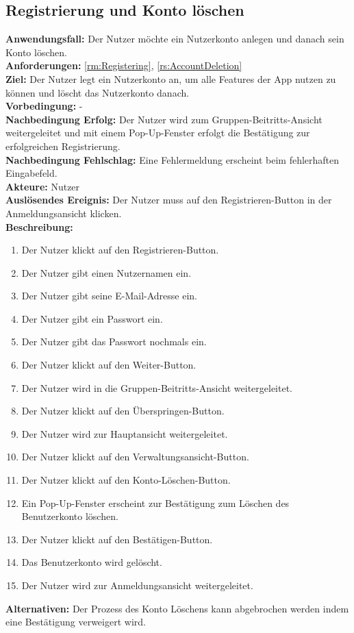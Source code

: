 \documentclass[parskip=full]{scrartcl}
\begin{document}
\subsection{Registrierung und Konto löschen}
\textbf{Anwendungsfall:} Der Nutzer möchte ein Nutzerkonto anlegen und danach sein Konto löschen.\\
\textbf{Anforderungen:} \ref{rm:Registering}, \ref{rs:AccountDeletion} \\
\textbf{Ziel:} Der Nutzer legt ein Nutzerkonto an, um alle Features der App nutzen zu können und löscht das Nutzerkonto danach.\\
\textbf{Vorbedingung:} -\\
\textbf{Nachbedingung Erfolg:} Der Nutzer wird zum Gruppen-Beitritts-Ansicht weitergeleitet und mit einem Pop-Up-Fenster erfolgt die Bestätigung zur erfolgreichen Registrierung.\\
\textbf{Nachbedingung Fehlschlag:} Eine Fehlermeldung erscheint beim fehlerhaften Eingabefeld.\\
\textbf{Akteure:} Nutzer\\
\textbf{Auslösendes Ereignis:} Der Nutzer muss auf den Registrieren-Button in der Anmeldungsansicht klicken.\\
\textbf{Beschreibung:}
\begin{enumerate}
    \item Der Nutzer klickt auf den Registrieren-Button.
    \item Der Nutzer gibt einen Nutzernamen ein.
    \item Der Nutzer gibt seine E-Mail-Adresse ein.
    \item Der Nutzer gibt ein Passwort ein.
    \item Der Nutzer gibt das Passwort nochmals ein.
    \item Der Nutzer klickt auf den Weiter-Button.
    \item Der Nutzer wird in die Gruppen-Beitritts-Ansicht weitergeleitet.
    \item Der Nutzer klickt auf den Überspringen-Button.
    \item Der Nutzer wird zur Hauptansicht weitergeleitet.
    \item Der Nutzer klickt auf den Verwaltungsansicht-Button.
    \item Der Nutzer klickt auf den Konto-Löschen-Button.
    \item Ein Pop-Up-Fenster erscheint zur Bestätigung zum Löschen des Benutzerkonto löschen.
    \item Der Nutzer klickt auf den Bestätigen-Button.
    \item Das Benutzerkonto wird gelöscht.
    \item Der Nutzer wird zur Anmeldungsansicht weitergeleitet.
\end{enumerate}
\textbf{Alternativen:} Der Prozess des Konto Löschens kann abgebrochen werden indem eine Bestätigung verweigert wird.
\newpage
\end{document}
